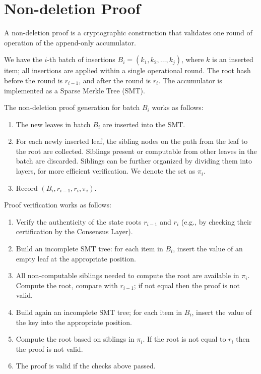 \documentclass[twocolumn]{article}
\begin{document}
\section{Non-deletion Proof}
\label{sec:consistency-proof}

A non-deletion proof is a cryptographic construction that validates one round of operation of  the append-only accumulator.

We have the $i$-th batch of insertions $B_i = (k_1, k_2, \dots, k_j)$, where $k$ is an inserted item; all insertions are applied within a single operational round. The root hash before the round is $r_{i-1}$, and after the round is $r_i$. The accumulator is implemented as a Sparse Merkle Tree (SMT).

The non-deletion proof generation for batch $B_i$ works as follows:

\begin{enumerate}
    \item The new leaves in batch $B_i$ are inserted into the SMT.
    \item For each newly inserted leaf, the sibling nodes on the path from the leaf to the root are collected. Siblings present or computable from other leaves in the batch are discarded. Siblings can be further organized by dividing them into layers, for more efficient verification. We denote the set as $\pi_i$.
    \item Record $(B_i, r_{i-1}, r_i, \pi_i)$.
\end{enumerate}

Proof verification works as follows:

\begin{enumerate}
    \item Verify the authenticity of the state roots $r_{i-1}$ and $r_i$ (e.g., by checking their certification by the Consensus Layer).
    \item Build an incomplete SMT tree: for each item in $B_i$, insert the value of an empty leaf at the appropriate position.
    \item All non-computable siblings needed to compute the root are available in $\pi_i$. Compute the root, compare with $r_{i-1}$; if not equal then the proof is not valid.
    \item Build again an incomplete SMT tree; for each item in $B_i$, insert the value of the key into the appropriate position.
    \item Compute the root based on siblings in $\pi_i$. If the root is not equal to $r_i$ then the proof is not valid.
    \item The proof is valid if the checks above passed.
\end{enumerate}
\end{document}
